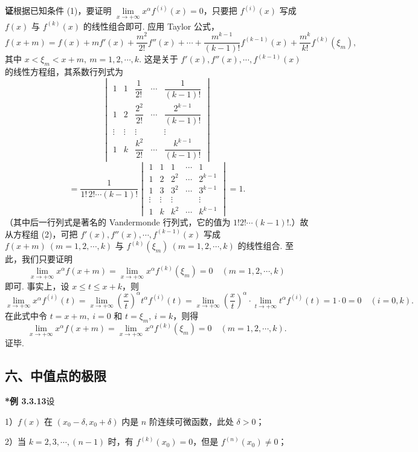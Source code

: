 \documentclass[UTF8,12pt,a4paper,fontset=fandol]{ctexart}
\begin{document}
\noindent\textbf{证}\quad 根据已知条件 (1)，要证明 $\lim\limits_{x\to+\infty}x^\alpha f^{(i)}(x)=0$，只要把 $f^{(i)}(x)$ 写成 $f(x)$ 与 $f^{(k)}(x)$ 的线性组合即可. 应用 Taylor 公式，
\[
  f(x+m)=f(x)+mf'(x)+\frac{m^2}{2!}f''(x)+\cdots
  +\frac{m^{k-1}}{(k-1)!}f^{(k-1)}(x)+\frac{m^k}{k!}f^{(k)}(\xi_m), \tag{2}
\]
其中 $x<\xi_m<x+m,\ m=1,2,\cdots,k$. 这是关于 $f'(x),f''(x),\cdots,f^{(k-1)}(x)$ 的线性方程组，其系数行列式为
\[
  \begin{vmatrix}
  1&1&\dfrac1{2!}&\cdots&\dfrac1{(k-1)!}\\
  1&2&\dfrac{2^2}{2!}&\cdots&\dfrac{2^{k-1}}{(k-1)!}\\
  \vdots&\vdots&\vdots& &\vdots\\
  1&k&\dfrac{k^2}{2!}&\cdots&\dfrac{k^{k-1}}{(k-1)!}
  \end{vmatrix}
\]
\[
  =\frac{1}{1!\,2!\cdots(k-1)!}
  \begin{vmatrix}
  1&1&1&\cdots&1\\
  1&2&2^2&\cdots&2^{k-1}\\
  1&3&3^2&\cdots&3^{k-1}\\
  \vdots&\vdots&\vdots& &\vdots\\
  1&k&k^2&\cdots&k^{k-1}
  \end{vmatrix}=1.
\]
（其中后一行列式是著名的 Vandermonde 行列式，它的值为 $1!2!\cdots(k-1)!$.）故从方程组 (2)，可把 $f'(x),f''(x),\cdots,f^{(k-1)}(x)$ 写成 $f(x+m)\ (m=1,2,\cdots,k)$ 与 $f^{(k)}(\xi_m)\ (m=1,2,\cdots,k)$ 的线性组合. 至此，我们只要证明
\[
  \lim_{x\to+\infty}x^\alpha f(x+m)=\lim_{x\to+\infty}x^\alpha f^{(k)}(\xi_m)=0\quad(m=1,2,\cdots,k)
\]
即可. 事实上，设 $x\le t\le x+k$，则
\[
  \lim_{x\to+\infty}x^\alpha f^{(i)}(t)
  =\lim_{x\to+\infty}\left(\frac{x}{t}\right)^\alpha t^\alpha f^{(i)}(t)
  =\lim_{x\to+\infty}\left(\frac{x}{t}\right)^\alpha\cdot\lim_{t\to+\infty}t^\alpha f^{(i)}(t)
  =1\cdot0=0\quad(i=0,k).
\]
在此式中令 $t=x+m,\ i=0$ 和 $t=\xi_m,\ i=k$，则得
\[
  \lim_{x\to+\infty}x^\alpha f(x+m)
  =\lim_{x\to+\infty}x^\alpha f^{(k)}(\xi_m)=0\quad(m=1,2,\cdots,k).
\]
证毕.

\subsection*{六、中值点的极限}

\noindent\textbf{*例 3.3.13}\quad 设

1）$f(x)$ 在 $(x_0-\delta,x_0+\delta)$ 内是 $n$ 阶连续可微函数，此处 $\delta>0$；

2）当 $k=2,3,\cdots,(n-1)$ 时，有 $f^{(k)}(x_0)=0$，但是 $f^{(n)}(x_0)\ne0$；
\end{document}
